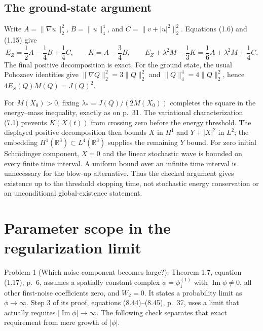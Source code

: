 \documentclass[10pt]{article}
\begin{document}
\subsection*{The ground-state argument}
Write \(A=\|\nabla u\|_2^2\), \(B=\|u\|_4^4\), and \(C=\|v+|u|^2\|_2^2\). Equations (1.6) and (1.15) give \[E_Z=\frac12 A-\frac14B+\frac14C,\qquad
 K=A-\frac34B,\qquad
 E_Z+\lambda^2M-\frac13K=\frac16A+\lambda^2M+\frac14C.\] The final positive decomposition is exact. For the ground state, the usual Pohozaev identities give \(\|\nabla Q\|_2^2=3\|Q\|_2^2\) and \(\|Q\|_4^4=4\|Q\|_2^2\), hence \(4E_S(Q)M(Q)=J(Q)^2\).\par
For \(M(X_0)>0\), fixing \(\lambda_*=J(Q)/(2M(X_0))\) completes the square in the energy–mass inequality, exactly as on p. 31. The variational characterization (7.1) prevents \(K(X(t))\) from crossing zero before the energy threshold. The displayed positive decomposition then bounds \(X\) in \(H^1\) and \(Y+|X|^2\) in \(L^2\); the embedding \(H^1(\mathbb R^3)\subset L^4(\mathbb R^3)\) supplies the remaining \(Y\) bound. For zero initial Schrödinger component, \(X=0\) and the linear stochastic wave is bounded on every finite time interval. A uniform bound over an infinite time interval is unnecessary for the blow-up alternative. Thus the checked argument gives existence up to the threshold stopping time, not stochastic energy conservation or an unconditional global-existence statement.\par
\section*{Parameter scope in the regularization limit}
Problem 1 (Which noise component becomes large?).  Theorem 1.7, equation (1.17), p. 6, assumes a spatially constant complex \(\phi=\phi^{(1)}_1\) with \(\operatorname{Im}\phi\ne0\), all other first-noise coefficients zero, and \(W_2=0\). It states a probability limit as \(\phi\to\infty\). Step 3 of its proof, equations (8.44)–(8.45), p. 37, uses a limit that actually requires \(|\operatorname{Im}\phi|\to\infty\). The following check separates that exact requirement from mere growth of \(|\phi|\).\par
\end{document}
